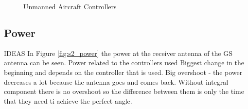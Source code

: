 \begin{figure}[H]
	\hfill
	\hfill
	\caption{Unmanned Aircraft Controllers}
	\label{fig:s1_ua}
\end{figure}

\subsection{Power}
IDEAS
In Figure \ref{fig:s2_power} the power at the receiver antenna of the GS antenna can be seen.
Power related to the controllers used
Biggest change in the beginning and depends on the controller that is used.
Big overshoot - the power decreases a lot because the antenna goes and comes back.
Without integral component there is no overshoot so the difference between them is only the time that they need ti achieve the perfect angle.


